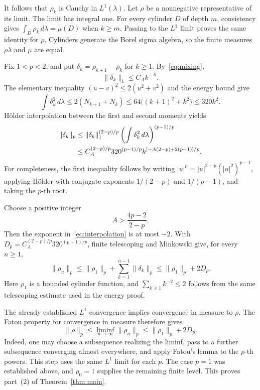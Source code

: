 \documentclass[11pt]{article}
\theoremstyle{remark}
\newcommand{\norm}[2]{\lVert #1\rVert_{#2}}
\begin{document}
It follows that \(\rho_k\) is Cauchy in \(L^1(\lambda)\).
Let \(\rho\) be a nonnegative representative of its limit.
The limit has integral one.  For every cylinder \(D\) of depth
\(m\), consistency gives \(\int_D\rho_k\,d\lambda=\mu(D)\)
when \(k\geq m\).  Passing to the \(L^1\) limit proves the same
identity for \(\rho\).  Cylinders generate the Borel sigma algebra,
so the finite measures \(\rho\lambda\) and \(\mu\) are equal.

Fix \(1<p<2\), and put
\(\delta_k=\rho_{k+1}-\rho_k\) for \(k\geq1\).
By~\eqref{eq:mixing},
\begin{equation}\label{eq:increment-one}
  \norm{\delta_k}{1}\leq C_A k^{-A}.
\end{equation}
The elementary inequality \((u-v)^2\leq2(u^2+v^2)\) and the
energy bound give
\begin{equation}\label{eq:increment-two}
  \int\delta_k^2\,d\lambda
  \leq2(N_{k+1}+N_k)
  \leq64\bigl((k+1)^2+k^2\bigr)
  \leq320k^2.
\end{equation}
H\"older interpolation between the first and second moments yields
\begin{align}
  \norm{\delta_k}{p}
  &\leq\norm{\delta_k}{1}^{(2-p)/p}
            \left(\int\delta_k^2\,d\lambda\right)^{(p-1)/p}
       \notag\\
  &\leq C_A^{(2-p)/p}320^{(p-1)/p}
           k^{[-A(2-p)+2(p-1)]/p}.\label{eq:interpolation}
\end{align}
For completeness, the first inequality follows by writing
\(|u|^p=|u|^{2-p}(|u|^2)^{p-1}\), applying H\"older with
conjugate exponents \(1/(2-p)\) and \(1/(p-1)\), and taking
the \(p\)-th root.

Choose a positive integer
\[
  A>\frac{4p-2}{2-p}.
\]
Then the exponent in~\eqref{eq:interpolation} is at most \(-2\).
With \(D_p=C_A^{(2-p)/p}320^{(p-1)/p}\), finite telescoping and
Minkowski give, for every \(n\geq1\),
\begin{equation}\label{eq:uniform-lp}
  \norm{\rho_n}{p}
  \leq\norm{\rho_1}{p}+\sum_{k=1}^{n-1}\norm{\delta_k}{p}
  \leq\norm{\rho_1}{p}+2D_p.
\end{equation}
Here \(\rho_1\) is a bounded cylinder function, and
\(\sum_{k\geq1}k^{-2}\leq2\) follows from the same telescoping
estimate used in the energy proof.

The already established \(L^1\) convergence implies convergence in
measure to \(\rho\).  The Fatou property for convergence in measure
therefore gives
\[
  \norm{\rho}{p}\leq\liminf_{n\to\infty}\norm{\rho_n}{p}
  \leq\norm{\rho_1}{p}+2D_p.
\]
Indeed, one may choose a subsequence realizing the liminf, pass to a
further subsequence converging almost everywhere, and apply Fatou's
lemma to the \(p\)-th powers.  This step uses the same \(L^1\)
limit for each \(p\).  The case \(p=1\) was established above,
and \(\rho_0=1\) supplies the remaining finite level.
This proves part~(2) of Theorem~\ref{thm:main}.
\end{document}
